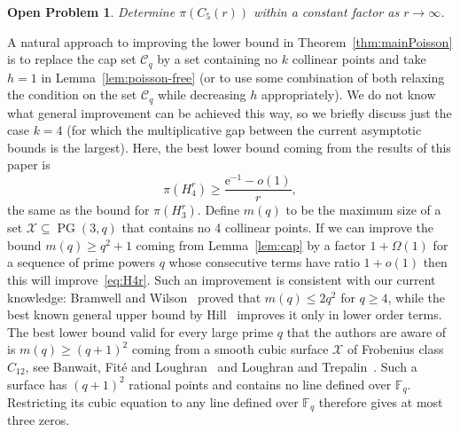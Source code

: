 \documentclass[10pt,a4paper]{article}
\numberwithin{equation}{section}
\newtheorem{problem}[theorem]{Open Problem}
\theoremstyle{definition}
\theoremstyle{remark}
\newcommand{\me}{\mathrm{e}}
\begin{document}
\begin{problem} Determine $\pi(C_5(r))$ within a constant factor as $r\to \infty$.\end{problem}

A natural approach to improving the lower bound in Theorem~\ref{thm:mainPoisson} is to replace the cap set $\mathcal C_q$ by a set containing no $k$ collinear points and take $h=1$ in Lemma~\ref{lem:poisson-free} (or to use some combination of both relaxing the condition on the set $\mathcal C_q$ while decreasing $h$ appropriately). We do not know what general improvement can be achieved this way, so we briefly discuss just the case $k=4$ (for which the multiplicative gap between the current asymptotic bounds is the largest). Here, the best lower bound coming from the results of this paper is 
 \begin{equation}\label{eq:H4r}
 \pi(H_4^r)\ge \frac{\me^{-1}-o(1)}r,
 \end{equation} the same as the bound for $\pi(H_3^r)$. Define $m(q)$ to be the maximum size of a set $\mathcal X\subseteq \operatorname{PG}(3,q)$ that contains no 4 collinear points. If we can improve the bound $m(q)\ge q^2+1$ coming from Lemma~\ref{lem:cap} by a factor $1+\Omega(1)$ for a sequence of prime powers $q$ whose consecutive terms have ratio $1+o(1)$ then this will improve~\eqref{eq:H4r}. Such an improvement is consistent with our current knowledge:  Bramwell and Wilson~\cite{BramwellWilson73} proved that $m(q)\le 2q^2$ for $q\ge4$, while the best known general upper bound by Hill~\cite{Hill78} improves it only in lower order terms. The best  lower bound valid for every large prime $q$ that the authors are aware of is $m(q)\ge (q+1)^2$ coming from a smooth cubic surface $\mathcal X$ of Frobenius class $C_{12}$, see Banwait, Fit\'e and Loughran~\cite[Eq.~(2.1) and Table~7.1]{BanwaitFiteLoughran19} and Loughran and Trepalin~\cite[Theorem~1.1]{LoughranTrepalin20}. Such a surface has $(q+1)^2$ rational points and contains no line defined over $\mathbb F_q$. Restricting its cubic equation to any line defined over $\mathbb F_q$ therefore gives at most three zeros.
\end{document}

